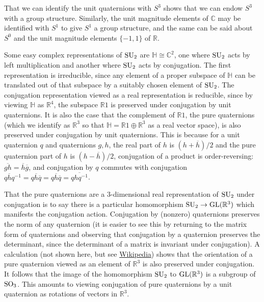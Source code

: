 \documentclass[../../rtnotes.tex]{subfiles}
\begin{document}
That we can identify the unit quaternions with $S^3$ shows that we can endow $S^3$ with a group structure. Similarly, the unit magnitude elements of $\mathbb C$ may be identified with $S^1$ to give $S^1$ a group structure, and the same can be said about $S^0$ and the unit magnitude elements $\{-1,1\}$ of $\mathbb R$.

Some easy complex representations of $\operatorname{SU}_2$ are $\mathbb H\cong\mathbb C^2$, one where $\operatorname{SU}_2$ acts by left multiplication and another where $\operatorname{SU}_2$ acts by conjugation. The first representation is irreducible, since any element of a proper subspace of $\mathbb H$ can be translated out of that subspace by a suitably chosen element of $\operatorname{SU}_2$. The conjugation representation viewed as a real representation is reducible, since by viewing $\mathbb H$ as $\mathbb R^4$, the subspace $\mathbb R1$ is preserved under conjugation by unit quaternions. It is also the case that the complement of $\mathbb R1$, the pure quaternions (which we identify as $\mathbb R^3$ so that $\mathbb H = \mathbb R1\oplus \mathbb R^3$ as a real vector space), is also preserved under conjugation by unit quaternions. This is because for a unit quaternion $q$ and quaternions $g,h$, the real part of $h$ is $(h+\overline{h})/2$ and the pure quaternion part of $h$ is $(h-\overline{h})/2$, conjugation of a product is order-reversing: $\overline{gh}= \overline{h}\overline{g}$, and conjugation by $q$ commutes with conjugation $q\overline{h}q^{-1} = q\overline{h}\overline{q} = \overline{qh\overline{q}} = \overline{qhq^{-1}}$.

That the pure quaternions are a $3$-dimensional real representation of $\operatorname{SU}_2$ under conjugation is to say there is a particular homomorphism $\operatorname{SU}_2\to\operatorname{GL}(\mathbb R^3)$ which manifests the conjugation action. Conjugation by (nonzero) quaternions preserves the norm of any quaternion (it is easier to see this by returning to the matrix form of quaternions and observing that conjugation by a quaternion preserves the determinant, since the determinant of a matrix is invariant under conjugation). A calculation (not shown here, but see \href{https://en.wikipedia.org/wiki/Versor#Representation_of_SO(3)}{Wikipedia}) shows that the orientation of a pure quaternion viewed as an element of $\mathbb R^3$ is also preserved under conjugation. It follows that the image of the homomorphism $\operatorname{SU}_2$ to $\operatorname{GL}(\mathbb R^3)$ is a subgroup of $\operatorname{SO}_3$. This amounts to viewing conjugation of pure quaternions by a unit quaternion as rotations of vectors in $\mathbb R^3$.
\end{document}
